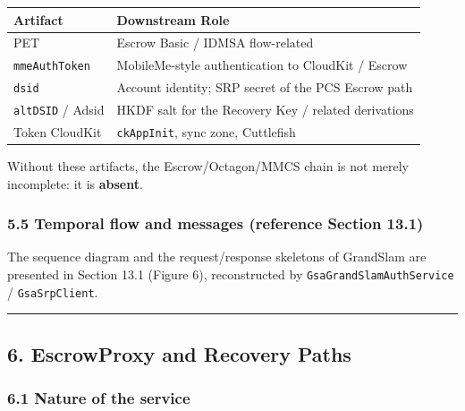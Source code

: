 \documentclass[
  english,
  10pt]{article}
\newcounter{none} %
\begin{document}
{\def\LTcaptype{none} %
\begin{longtable}[]{@{}
  >{\raggedright\arraybackslash}p{}
  >{\raggedright\arraybackslash}p{}@{}}
\toprule\noalign{}
\begin{minipage}[b]{\linewidth}\raggedright
Artifact
\end{minipage} & \begin{minipage}[b]{\linewidth}\raggedright
Downstream Role
\end{minipage} \\
\midrule\noalign{}
\endhead
\bottomrule\noalign{}
\endlastfoot
PET & Escrow Basic / IDMSA flow-related \\
\texttt{mmeAuthToken} & MobileMe-style authentication to CloudKit /
Escrow \\
\texttt{dsid} & Account identity; SRP secret of the PCS Escrow path \\
\texttt{altDSID} / Adsid & HKDF salt for the Recovery Key / related
derivations \\
Token CloudKit & \texttt{ckAppInit}, sync zone, Cuttlefish \\
\end{longtable}
}

Without these artifacts, the Escrow/Octagon/MMCS chain is not merely
incomplete: it is \textbf{absent}.

\subsubsection{5.5 Temporal flow and messages (reference Section
13.1)}\label{temporal-flow-and-messages-reference-section-13.1}

The sequence diagram and the request/response skeletons of GrandSlam are
presented in Section 13.1 (Figure 6), reconstructed by
\texttt{GsaGrandSlamAuthService} / \texttt{GsaSrpClient}.

\begin{center}\rule{0.5\linewidth}{0.5pt}\end{center}

\subsection{6. EscrowProxy and Recovery
Paths}\label{escrowproxy-and-recovery-paths}

\subsubsection{6.1 Nature of the service}\label{nature-of-the-service}
\end{document}
